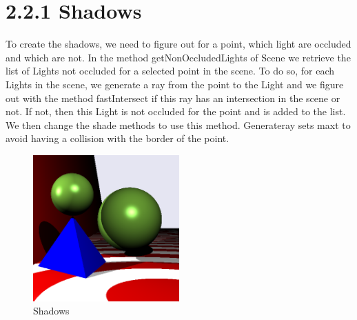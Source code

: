 \documentclass[10pt,a4paper]{report}
\begin{document}
\section*{2.2.1   Shadows}
To create the shadows, we need to figure out for a point, which light are occluded and which are not. In the method getNonOccludedLights of Scene we retrieve the list of Lights not occluded for a selected point in the scene. To do so, for each Lights in the scene, we generate a ray from the point to the Light and we figure out with the method fastIntersect if this ray has an intersection in the scene or not. If not, then this Light is not occluded for the point and is added to the list. We then change the shade methods to use this method. Generateray sets maxt to avoid having a collision with the border of the point.
\begin{figure}[h!]
\caption{Shadows}
  \centering
    \includegraphics[width=0.5\textwidth]{02_Exc_Raytracing_Framework/2_2_1.png}
\end{figure}
\end{document}
